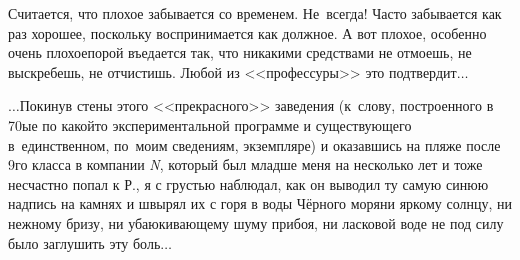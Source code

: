 Считается, что плохое забывается со временем. Не~всегда! Часто забывается как раз хорошее, поскольку воспринимается как должное. А вот плохое, особенно очень плохое\mdash порой въедается так, что никакими средствами не отмоешь, не выскребешь, не отчистишь. Любой из <<профессуры>> это подтвердит$\ldots$

$\ldots$Покинув стены этого <<прекрасного>> заведения (к~слову, построенного в 70\sdash ые по какой\sdash то экспериментальной программе и существующего в~единственном, по~моим сведениям, экземпляре) и оказавшись на пляже после 9\sdash го класса в компании \textit{N}, который был младше меня на несколько лет и тоже несчастно попал к Р., я с грустью наблюдал, как он выводил ту самую синюю надпись на камнях и швырял их с горя в воды Чёрного моря\mdash ни яркому солнцу, ни нежному бризу, ни убаюкивающему шуму прибоя, ни ласковой воде не под силу было заглушить эту боль$\ldots$